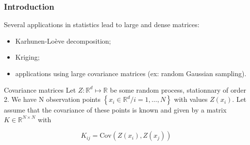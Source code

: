 \begin{frame}
\frametitle{Introduction}
Several applications in statistics lead to large and dense matrices:
\begin{itemize}
\item Karhunen-Loève decomposition;
\item Kriging;
\item applications using large covariance matrices (ex: random Gaussian sampling).
\end{itemize}

\begin{block}{Covariance matrices}
Let $Z:\mathbb{R}^d \mapsto \mathbb{R}$ be some random process, stationnary of 
order 2. We have N observation points $\left\{ x_i \in \mathbb{R}^d /i=1,\hdots,N \right\}$ with values $Z(x_i)$.
Let assume that the covariance of these points is known and given by a matrix $K \in \mathbb{R}^{N \times N}$ with

\[ K_{ij} = \mathrm{Cov}(Z(x_i),Z(x_j)) \]
\end{block}
\end{frame}

%
%
%

